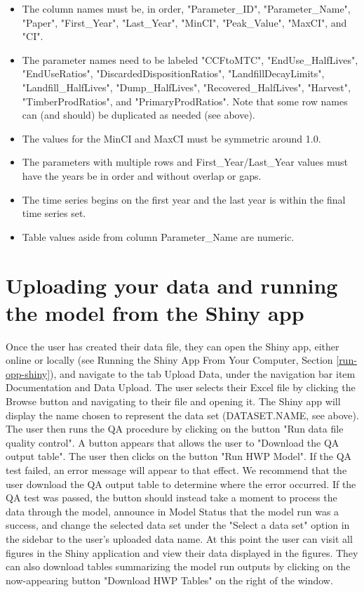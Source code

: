 \documentclass[
]{book}
\providecommand{\tightlist}{%
  \setlength{\itemsep}{0pt}\setlength{\parskip}{0pt}}
\begin{document}
\begin{itemize}
\tightlist
\item
  The column names must be, in order, "Parameter\_ID", "Parameter\_Name", "Paper", "First\_Year", "Last\_Year", "MinCI", "Peak\_Value", "MaxCI", and "CI".\\
\item
  The parameter names need to be labeled "CCFtoMTC", "EndUse\_HalfLives", "EndUseRatios", "DiscardedDispositionRatios", "LandfillDecayLimits", "Landfill\_HalfLives", "Dump\_HalfLives", "Recovered\_HalfLives", "Harvest", "TimberProdRatios", and "PrimaryProdRatios". Note that some row names can (and should) be duplicated as needed (see above).\\
\item
  The values for the MinCI and MaxCI must be symmetric around 1.0.\\
\item
  The parameters with multiple rows and First\_Year/Last\_Year values must have the years be in order and without overlap or gaps.\\
\item
  The time series begins on the first year and the last year is within the final time series set.\\
\item
  Table values aside from column Parameter\_Name are numeric.
\end{itemize}

\hypertarget{own-shiny}{%
\section{Uploading your data and running the model from the Shiny app}\label{own-shiny}}

Once the user has created their data file, they can open the Shiny app, either online or locally (see Running the Shiny App From Your Computer, Section \ref{run-opp-shiny}), and navigate to the tab Upload Data, under the navigation bar item Documentation and Data Upload. The user selects their Excel file by clicking the Browse button and navigating to their file and opening it. The Shiny app will display the name chosen to represent the data set (DATASET.NAME, see above). The user then runs the QA procedure by clicking on the button "Run data file quality control". A button appears that allows the user to "Download the QA output table". The user then clicks on the button "Run HWP Model". If the QA test failed, an error message will appear to that effect. We recommend that the user download the QA output table to determine where the error occurred. If the QA test was passed, the button should instead take a moment to process the data through the model, announce in Model Status that the model run was a success, and change the selected data set under the "Select a data set" option in the sidebar to the user's uploaded data name. At this point the user can visit all figures in the Shiny application and view their data displayed in the figures. They can also download tables summarizing the model run outputs by clicking on the now-appearing button "Download HWP Tables" on the right of the window.
\end{document}
